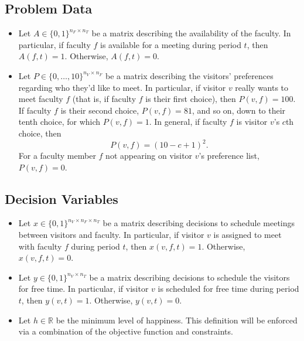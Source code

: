 \documentclass[12pt]{article}
\newcommand{\R}{\mathbb R}
\theoremstyle{definition}
\newtheorem{definition set}{Definition Set}%
\newtheorem{problem statement}{Problem Statement} %
\theoremstyle{remark}
\theoremstyle{remark}
\begin{document}
\subsection{Problem Data}
\begin{itemize}
\item
Let $A \in \{0,1\}^{n_F \times n_T}$ be a matrix describing the availability of the faculty.
In particular, if faculty $f$ is available for a meeting during period $t$, then $A(f,t) = 1$.
Otherwise, $A(f,t) = 0$.

\item
Let $P \in \{0, \hdots  , 10\}^{n_V \times n_F}$ be a matrix describing the visitors\rq{} preferences regarding who they\rq{}d like to meet.
In particular, if visitor $v$ really wants to meet faculty $f$ (that is, if faculty $f$ is their first choice), then $P(v,f) = 100$.
If faculty $f$ is their second choice, $P(v,f) = 81$, and so on, down to their tenth choice, for which $P(v,f) = 1$.
In general, if faculty $f$ is visitor $v$\rq{}s $c$th choice, then
\begin{equation}
P(v,f) = (10 - c + 1)^2.
\end{equation}
For a faculty member $f$ not appearing on visitor $v$\rq{}s preference list, $P(v,f) = 0$.
\end{itemize}

\subsection{Decision Variables}
\begin{itemize}
\item
Let $x \in \{0,1\}^{n_V \times n_F \times n_T}$ be a matrix describing decisions to schedule meetings between visitors and faculty.
In particular, if visitor $v$ is assigned to meet with faculty $f$ during period $t$, then $x(v,f,t) = 1$.
Otherwise, $x(v,f,t) = 0$.

\item
Let $y \in \{0,1\}^{n_V \times n_T}$ be a matrix describing decisions to schedule the visitors for free time.
In particular, if visitor $v$ is scheduled for free time during period $t$, then $y(v,t) = 1$.
Otherwise, $y(v,t) = 0$.

\item
Let $h \in \R$ be the minimum level of happiness.
This definition will be enforced via a combination of the objective function and constraints.
\end{itemize}
\end{document}
